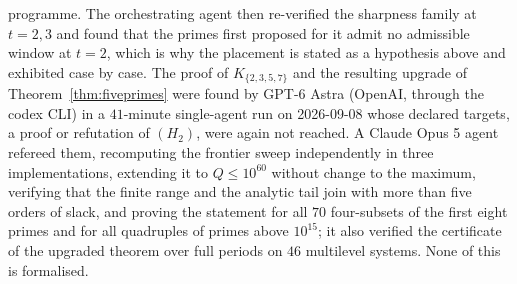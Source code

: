 programme. The orchestrating agent then re-verified the sharpness family at $t=2,3$ and found that the
primes first proposed for it admit no admissible window at $t=2$, which is why the placement is stated
as a hypothesis above and exhibited case by case.
The proof of $K_{\{2,3,5,7\}}$ and the resulting upgrade of Theorem~\ref{thm:fiveprimes} were found by
GPT-6 Astra (OpenAI, through the codex CLI) in a $41$-minute single-agent run on 2026-09-08 whose
declared targets, a proof or refutation of $(H_2)$, were again not reached. A Claude Opus 5 agent
refereed them, recomputing the frontier sweep independently in three implementations, extending it to
$Q\le10^{60}$ without change to the maximum, verifying that the finite range and the analytic tail
join with more than five orders of slack, and proving the statement for all $70$ four-subsets of the
first eight primes and for all quadruples of primes above $10^{15}$; it also verified the certificate
of the upgraded theorem over full periods on $46$ multilevel systems. None of this is formalised.
